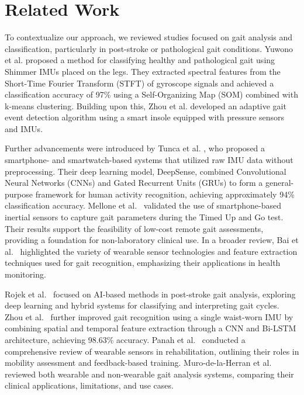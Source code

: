 \section{Related Work}
\label{sec:related_work}

To contextualize our approach, we reviewed studies focused on gait analysis and classification, particularly in post-stroke or pathological gait conditions.
Yuwono et al. \cite{ref9} proposed a method for classifying healthy and pathological gait using Shimmer IMUs placed on the legs. They extracted spectral features 
from the Short-Time Fourier Transform (STFT) of gyroscope signals and achieved a classification accuracy of 97\% using a Self-Organizing Map (SOM) combined with 
k-means clustering. Building upon this, Zhou et al. \cite{ref10} developed an adaptive gait event detection algorithm using a smart insole equipped with pressure 
sensors and IMUs.

Further advancements were introduced by Tunca et al. \cite{ref11}, who proposed a smartphone- and smartwatch-based systems that utilized raw IMU data without preprocessing. 
Their deep learning model, DeepSense, combined Convolutional Neural Networks (CNNs) and Gated Recurrent Units (GRUs) to form a general-purpose framework for human activity 
recognition, achieving approximately 94\% classification accuracy. Mellone et al.\ \cite{ref12} validated the use of smartphone-based inertial sensors to capture gait parameters 
during the Timed Up and Go test. Their results support the feasibility of low-cost remote gait assessments, providing a foundation for non-laboratory clinical use. In a broader 
review, Bai et al.\ \cite{ref13} highlighted the variety of wearable sensor technologies and feature extraction techniques used for gait recognition, emphasizing their applications 
in health monitoring.

Rojek et al.\ \cite{ref14} focused on AI-based methods in post-stroke gait analysis, exploring deep learning and hybrid systems for classifying and interpreting gait 
cycles. Zhou et al.\ \cite{ref15} further improved gait recognition using a single waist-worn IMU by combining spatial and temporal feature extraction through a CNN 
and Bi-LSTM architecture, achieving 98.63\% accuracy. Panah et al.\ \cite{ref16} conducted a comprehensive review of wearable sensors in rehabilitation, outlining their 
roles in mobility assessment and feedback-based training. Muro-de-la-Herran et al.\ \cite{ref17} reviewed both wearable and non-wearable gait analysis systems, comparing 
their clinical applications, limitations, and use cases.

